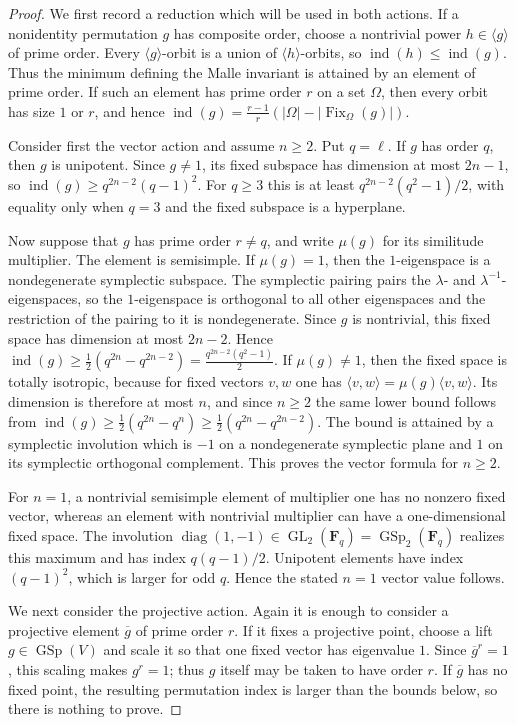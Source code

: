 \documentclass[10pt,a4paper]{amsart}
\newcommand{\F}{\mathbf F}
\newcommand{\GL}{\operatorname{GL}}
\newcommand{\GSp}{\operatorname{GSp}}
\newcommand{\ind}{\operatorname{ind}}
\begin{document}
\begin{proof}
We first record a reduction which will be used in both actions.  If a
nonidentity permutation $g$ has composite order, choose a nontrivial
power $h\in\langle g\rangle$ of prime order.  Every
$\langle g\rangle$-orbit is a union of $\langle h\rangle$-orbits, so
$\ind(h)\leq\ind(g)$.  Thus the minimum defining the Malle invariant is
attained by an element of prime order.  If such an element has prime
order $r$ on a set $\Omega$, then every orbit has size $1$ or $r$, and hence $\ind(g)=\frac{r-1}{r}(|\Omega|-|\operatorname{Fix}_\Omega(g)|)$.

Consider first the vector action and assume $n\geq2$.  Put $q=\ell$.
If $g$ has order $q$, then $g$ is unipotent.  Since $g\neq1$, its fixed
subspace has dimension at most $2n-1$, so $\ind(g)\geq q^{2n-2}(q-1)^2$.
For $q\geq3$ this is at least
$q^{2n-2}(q^2-1)/2$, with equality only when $q=3$ and the fixed
subspace is a hyperplane.

Now suppose that $g$ has prime order $r\neq q$, and write $\mu(g)$ for
its similitude multiplier.  The element is semisimple.  If
$\mu(g)=1$, then the $1$-eigenspace is a nondegenerate symplectic
subspace. The symplectic pairing pairs the $\lambda$- and
$\lambda^{-1}$-eigenspaces, so the $1$-eigenspace is orthogonal to all
other eigenspaces and the restriction of the pairing to it is
nondegenerate.  Since $g$ is nontrivial, this fixed space has dimension at most $2n-2$. Hence $\ind(g)\geq \frac12(q^{2n}-q^{2n-2})=\frac{q^{2n-2}(q^2-1)}2$.
If $\mu(g)\neq1$, then the fixed space is totally isotropic, because
for fixed vectors $v,w$ one has
$\langle v,w\rangle=\mu(g)\langle v,w\rangle$.  Its dimension is therefore at most $n$, and since $n\geq2$ the same lower bound follows from $\ind(g)\geq\frac12(q^{2n}-q^n)\geq\frac12(q^{2n}-q^{2n-2})$.
The bound is attained by a symplectic involution which is $-1$ on a
nondegenerate symplectic plane and $1$ on its symplectic orthogonal
complement.  This proves the vector formula for $n\geq2$.

For $n=1$, a nontrivial semisimple element of multiplier one has no
nonzero fixed vector, whereas an element with nontrivial multiplier can
have a one-dimensional fixed space.  The involution
$\operatorname{diag}(1,-1)\in\GL_2(\F_q)=\GSp_2(\F_q)$ realizes this
maximum and has index $q(q-1)/2$.  Unipotent elements have index
$(q-1)^2$, which is larger for odd $q$.  Hence the stated $n=1$ vector
value follows.

We next consider the projective action.  Again it is enough to consider a
projective element $\overline g$ of prime order $r$.  If it fixes a
projective point, choose a lift $g\in\GSp(V)$ and scale it so that one
fixed vector has eigenvalue $1$.  Since $\overline g^r=1$, this scaling
makes $g^r=1$; thus $g$ itself may be taken to have order $r$.  If
$\overline g$ has no fixed point, the resulting permutation index is
larger than the bounds below, so there is nothing to prove.


\end{proof}
\end{document}
